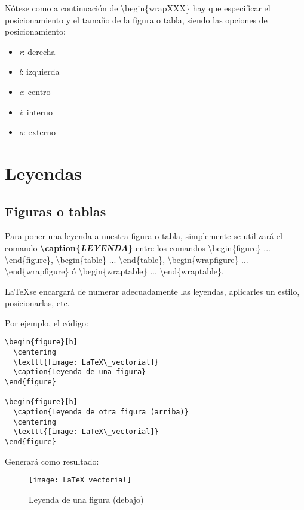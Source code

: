 Nótese como a continuación de \textbackslash begin\{wrapXXX\} hay que especificar el posicionamiento y el tamaño de la figura o tabla, siendo las opciones de posicionamiento: 
\begin{itemize}
	\item \emph{r}: derecha
	\item \emph{l}: izquierda
	\item \emph{c}: centro
	\item \emph{i}: interno
	\item \emph{o}: externo
\end{itemize}

\section{Leyendas}

\subsection{Figuras o tablas}

Para poner una leyenda a nuestra figura o tabla, simplemente se utilizará el comando \textbf{\textbackslash caption\{\emph{LEYENDA}\}} entre los comandos \textbackslash begin\{figure\} ... \textbackslash end\{figure\}, \textbackslash begin\{table\} ... \textbackslash end\{table\}, \textbackslash begin\{wrapfigure\} ... \textbackslash end\{wrapfigure\} ó \textbackslash begin\{wraptable\} ... \textbackslash end\{wraptable\}.

\LaTeX se encargará de numerar adecuadamente las leyendas, aplicarles un estilo, posicionarlas, etc.

Por ejemplo, el código:

\begin{lstlisting}[language={[LaTeX]Tex}]
\begin{figure}[h]
  \centering
  \texttt{[image: LaTeX\_vectorial]}
  \caption{Leyenda de una figura}	
\end{figure}

\begin{figure}[h]
  \caption{Leyenda de otra figura (arriba)}	
  \centering
  \texttt{[image: LaTeX\_vectorial]}
\end{figure}
\end{lstlisting}

Generará como resultado:

\begin{figure}[h]
	\centering
	\texttt{[image: LaTeX\_vectorial]}
	\caption{Leyenda de una figura (debajo)}	
\end{figure}

